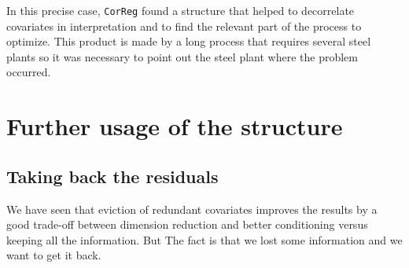 \documentclass[12pt,a4paper]{report}
\begin{document}
In this precise case, {\tt CorReg} found a structure that helped to decorrelate covariates in interpretation and to find the relevant part of the process to optimize. This product is made by a long process that requires several steel plants so it was necessary to point out the steel plant where the problem occurred.


\part{Further usage of the structure}	
			
		
\chapter{Taking back the residuals}
	We have seen that eviction of redundant covariates improves the results by a good trade-off between dimension reduction and better conditioning versus keeping all the information. But The fact is that we lost some information and we want to get it back.
\end{document}

